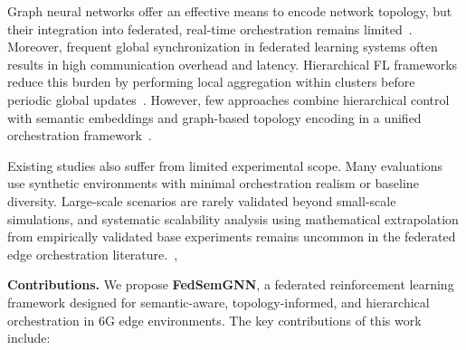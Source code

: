 \documentclass[conference]{IEEEtran}
\begin{document}
	Graph neural networks offer an effective means to encode network topology, but their integration into federated, real-time orchestration remains limited~\cite{makris2024gnnrl, zhang2024optimizing}. Moreover, frequent global synchronization in federated learning systems often results in high communication overhead and latency. Hierarchical FL frameworks reduce this burden by performing local aggregation within clusters before periodic global updates~\cite{}. However, few approaches combine hierarchical control with semantic embeddings and graph-based topology encoding in a unified orchestration framework~\cite{wu2024topology, vahabi2025}.
	
	Existing studies also suffer from limited experimental scope. Many evaluations use synthetic environments with minimal orchestration realism or baseline diversity. Large-scale scenarios are rarely validated beyond small-scale simulations, and systematic scalability analysis using mathematical extrapolation from empirically validated base experiments remains uncommon in the federated edge orchestration literature.~\cite{yang2023rlcs, shi2023}, 
	
	\noindent\textbf{Contributions.} We propose \textbf{FedSemGNN}, a federated reinforcement learning framework designed for semantic-aware, topology-informed, and hierarchical orchestration in 6G edge environments. The key contributions of this work include:
	
\end{document}
